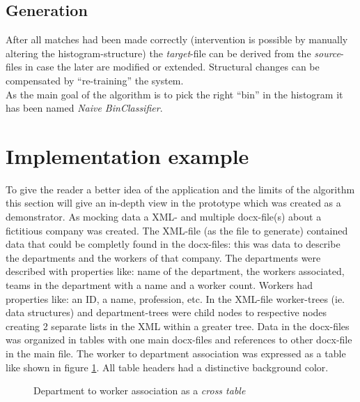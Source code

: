 \documentclass[conference]{IEEEtran}
\begin{document}
\subsection{Generation}
After all matches had been made correctly (intervention is possible by manually altering the
histogram-structure) the \textit{target}-file can be derived from the \textit{source}-files in
case the later are modified or extended. Structural changes can be compensated by ``re-training''
the system.\\As the main goal of the algorithm is to pick the right ``bin'' in the histogram it
has been named \textit{Naive BinClassifier}.

\section{Implementation example}
To give the reader a better idea of the application and the limits of the algorithm this section
will give an in-depth view in the prototype which was created as a demonstrator. As mocking
data a XML- and multiple docx-file(s) about a fictitious company was created. The XML-file (as
the file to generate) contained data that could be completly found in the docx-files: this was
data to describe the departments and the workers of that company. The departments were described
with properties like:\newline
name of the department, the workers associated, teams in the department with a name and a worker
count.\newline
Workers had properties like:
an ID, a name, profession, etc.\newline
In the XML-file worker-trees (ie. data structures) and department-trees were child nodes to
respective nodes creating 2 separate lists in the XML within a greater tree. Data in the
docx-files was organized in tables with one main docx-files and references to other
docx-file in the main file. The worker to  department association was expressed as a table
like shown in figure \ref{cross_table}. All table headers had a distinctive background color.
\begin{figure}[h]
 \centering
 \caption{Department to worker association as a \textit{cross table}}
 \label{cross_table}
\end{figure}
\end{document}
